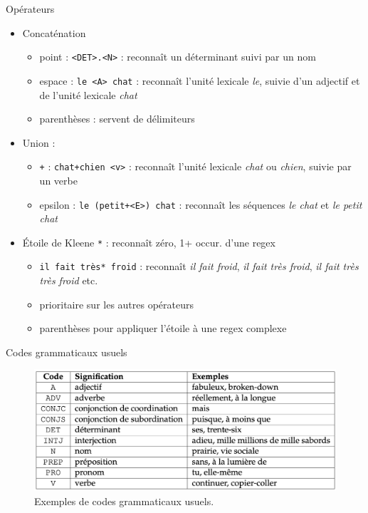 \documentclass[xetex,xcolor={table,usenames,dvipsnames}]{beamer}
\begin{document}
\begin{frame}{Opérateurs}
	\begin{itemize}
\item 	Concaténation
	\begin{itemize}
		\item point : \texttt{<DET>.<N>} : reconnaît un déterminant suivi par un nom
		\item espace : \texttt{le <A> chat} : reconnaît l'unité lexicale \textit{le}, suivie d'un adjectif et de l'unité lexicale \textit{chat}
		\item parenthèses : servent de délimiteurs 
	\end{itemize}
	
\item 	Union : 
	\begin{itemize}
		\item \texttt{+} : \texttt{chat+chien <v>} : reconnaît l'unité lexicale \textit{chat} ou \textit{chien}, suivie par un verbe
		\item epsilon : \texttt{le (petit+<E>) chat} : reconnaît les séquences \textit{le chat} et \textit{le petit chat}
	\end{itemize}
	
\item 	Étoile de Kleene \texttt{*} : reconnaît zéro, 1+ occur. d'une regex
	\begin{itemize}
		\item \texttt{il fait très* froid} : reconnaît \textit{il fait froid}, \textit{il fait très froid}, \textit{il fait très très froid} etc.
		\item prioritaire sur les autres opérateurs
		\item parenthèses pour appliquer l'étoile à une regex complexe
	\end{itemize}
	\end{itemize}
\end{frame}

\begin{frame}{Codes grammaticaux usuels}
			\begin{figure}[h] %
		\centering
		\includegraphics[width=1\linewidth]{img/codes_grammaticaux.png}
		\caption{Exemples de codes grammaticaux usuels.}
		\label{fig:ling_out_TAL}
	\end{figure}
\end{frame}
\end{document}
